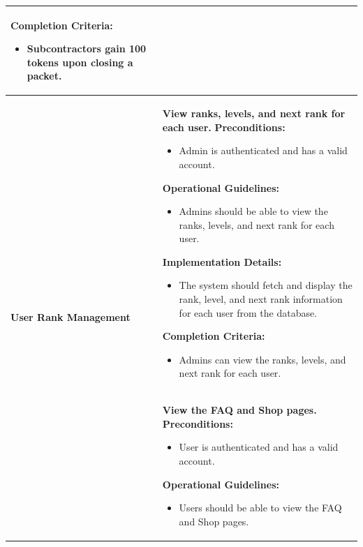 \begin{longtable}{ | p{} | p{} | }
\begin{itemize}
    \end{itemize}
    \textbf{Completion Criteria:} \newline
    \begin{itemize}
        \item Subcontractors gain 100 tokens upon closing a packet.
    \end{itemize} \\
    \hline
    \multirow{2}{=}{\textbf{User Rank Management}} & \textbf{View ranks, levels, and next rank for each user.} \newline
    \textbf{Preconditions:} \newline
    \begin{itemize}
        \item Admin is authenticated and has a valid account.
    \end{itemize}
    \textbf{Operational Guidelines:} \newline
    \begin{itemize}
        \item Admins should be able to view the ranks, levels, and next rank for each user.
    \end{itemize}
    \textbf{Implementation Details:} \newline
    \begin{itemize}
        \item The system should fetch and display the rank, level, and next rank information for each user from the database.
    \end{itemize}
    \textbf{Completion Criteria:} \newline
    \begin{itemize}
        \item Admins can view the ranks, levels, and next rank for each user.
    \end{itemize} \\
    \cline{2-2}
    & \textbf{View the FAQ and Shop pages.} \newline
    \textbf{Preconditions:} \newline
    \begin{itemize}
        \item User is authenticated and has a valid account.
    \end{itemize}
    \textbf{Operational Guidelines:} \newline
    \begin{itemize}
        \item Users should be able to view the FAQ and Shop pages.

\end{itemize}
\end{longtable}
